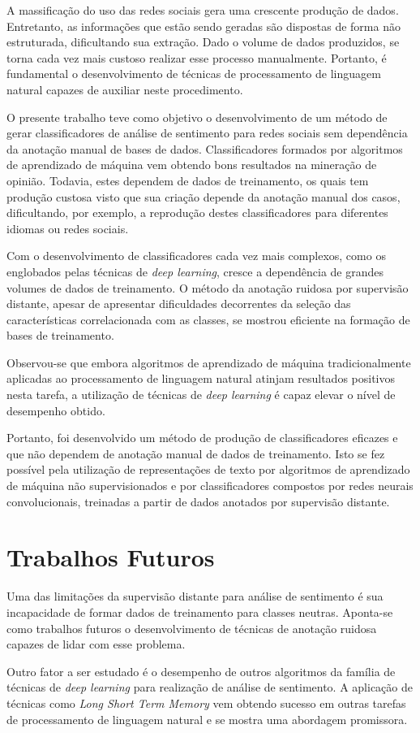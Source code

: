 A massificação do uso das redes sociais gera uma crescente produção de dados.
Entretanto, as informações que estão sendo geradas são dispostas de forma não estruturada, dificultando sua extração.
Dado o volume de dados produzidos, se torna cada vez mais custoso realizar esse processo manualmente.
Portanto, é fundamental o desenvolvimento de técnicas de processamento de linguagem natural capazes de auxiliar neste
procedimento.

O presente trabalho teve como objetivo o desenvolvimento de um método de gerar classificadores de análise de sentimento
para redes sociais sem dependência da anotação manual de bases de dados.
Classificadores formados por algoritmos de aprendizado de máquina vem obtendo bons resultados na mineração de opinião.
Todavia, estes dependem de dados de treinamento, os quais tem produção custosa visto que sua criação depende da anotação
manual dos casos, dificultando, por exemplo, a reprodução destes classificadores para diferentes idiomas ou redes
sociais.

Com o desenvolvimento de classificadores cada vez mais complexos, como os englobados pelas técnicas de
\textit{deep learning}, cresce a dependência de grandes volumes de dados de treinamento.
O método da anotação ruidosa por supervisão distante, apesar de apresentar dificuldades decorrentes da seleção das
características correlacionada com as classes, se mostrou eficiente na formação de bases de treinamento.

Observou-se que embora algoritmos de aprendizado de máquina tradicionalmente aplicadas ao processamento de linguagem
natural atinjam resultados positivos nesta tarefa, a utilização de técnicas de \textit{deep learning} é capaz elevar o
nível de desempenho obtido.

Portanto, foi desenvolvido um método de produção de classificadores eficazes e que não dependem de anotação manual de
dados de treinamento.
Isto se fez possível pela utilização de representações de texto por algoritmos de aprendizado de máquina não
supervisionados e por classificadores compostos por redes neurais convolucionais, treinadas a partir de dados anotados
por supervisão distante.

\section{Trabalhos Futuros}

Uma das limitações da supervisão distante para análise de sentimento é sua incapacidade de formar dados de treinamento
para classes neutras.
Aponta-se como trabalhos futuros o desenvolvimento de técnicas de anotação ruidosa capazes de lidar com esse problema.

Outro fator a ser estudado é o desempenho de outros algoritmos da família de técnicas de \textit{deep learning} para
realização de análise de sentimento.
A aplicação de técnicas como \textit{Long Short Term Memory} vem obtendo sucesso em outras tarefas de processamento de
linguagem natural e se mostra uma abordagem promissora.
